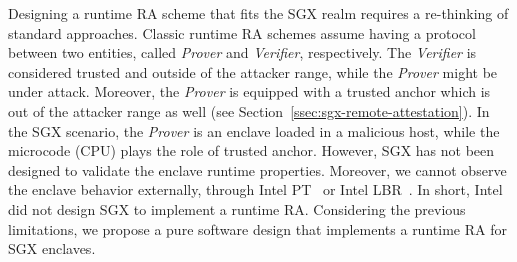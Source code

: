 %	
%	

Designing a runtime RA scheme that fits the SGX realm requires a re-thinking of 
standard approaches.
Classic runtime RA schemes assume having a protocol between two entities, 
called \emph{Prover} and \emph{Verifier}, respectively.
The \emph{Verifier} is considered trusted and outside of the attacker range, 
while the \emph{Prover} might be under attack. Moreover, the \emph{Prover} is 
equipped with a trusted anchor which is out of the 
attacker range as well (see Section~\ref{ssec:sgx-remote-attestation}).
In the SGX scenario, the \emph{Prover} is an enclave loaded in a 
malicious host, while the microcode (\ie CPU) plays the role of trusted anchor.
However, SGX has not been designed to validate the enclave runtime
properties. Moreover, we cannot observe the enclave behavior externally, \eg 
through Intel PT~\citep{kleen2015intel} or Intel 
LBR~\citep{7924286,9051250}.
In short, Intel did not design SGX to implement a runtime RA.
Considering the previous limitations, we propose a pure software design that 
implements a runtime RA for SGX enclaves.

